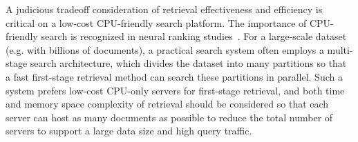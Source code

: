 A judicious tradeoff consideration of retrieval  effectiveness and efficiency is critical on  a low-cost CPU-friendly search platform. 
The importance of CPU-friendly search is recognized 
in neural ranking studies~\cite{Yang2021WSDM-BECR,2022WWWforwardIndex,2022CIKM-MacAvaneyGraphReRank,2023SIGIR-LADR}. 
For a large-scale  dataset (e.g. with billions of documents), a practical search system often employs  a multi-stage 
search architecture, which divides the dataset into many partitions so that  a fast first-stage  retrieval 
method  can  search these partitions in parallel.  Such a system  prefers low-cost
CPU-only servers for first-stage retrieval, and both time and memory space complexity of retrieval should be considered 
so that  each server can host as many documents as possible
to reduce the total number of servers to support a large data size and high query traffic. 


